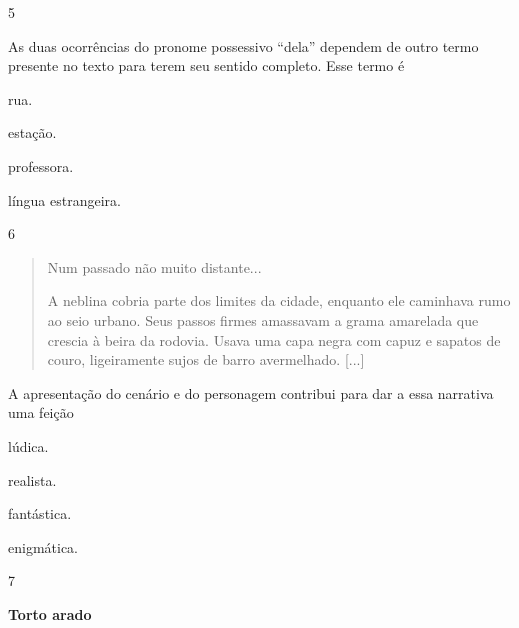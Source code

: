 \num{5}

As duas ocorrências do pronome possessivo ``dela'' dependem de outro
termo presente no texto para terem seu sentido completo. Esse termo é

\begin{escolha}
\item rua.

\item estação.

\item professora.

\item língua estrangeira.
\end{escolha}

\num{6}

\begin{quote}
Num passado não muito distante...

A neblina cobria parte dos limites da cidade, enquanto ele caminhava
rumo ao seio urbano. Seus passos firmes amassavam a grama amarelada que
crescia à beira da rodovia. Usava uma capa negra com capuz e sapatos de
couro, ligeiramente sujos de barro avermelhado. {[}...{]}
\end{quote}


A apresentação do cenário e do personagem contribui para dar a essa
narrativa uma feição

\begin{escolha}
\item lúdica.

\item realista.

\item fantástica.

\item enigmática.
\end{escolha}

\num{7}

\textbf{Torto arado}

